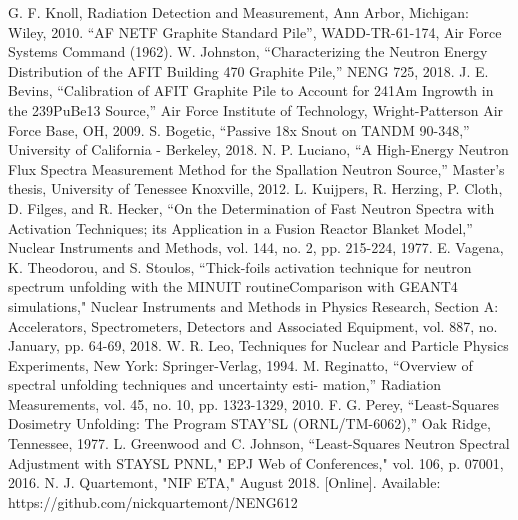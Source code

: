 \documentclass[journal]{IEEEtran}
\begin{document}
	\begin{thebibliography}{CLYC}
		G. F. Knoll, Radiation Detection and Measurement, Ann Arbor,
		Michigan: Wiley, 2010.
		“AF NETF Graphite Standard Pile”, WADD-TR-61-174, Air Force Systems Command (1962).
		W. Johnston, “Characterizing the Neutron Energy Distribution of the AFIT Building 470 Graphite Pile,” NENG 725, 2018.
		J. E. Bevins, “Calibration of AFIT Graphite Pile to Account for 241Am Ingrowth in the 239PuBe13 Source,” Air Force Institute of Technology, Wright-Patterson Air Force Base, OH, 2009. 
		S. Bogetic, “Passive 18x Snout on TANDM 90-348,” University of California - Berkeley, 2018.  
		N. P. Luciano, “A High-Energy Neutron Flux Spectra Measurement Method for
		the Spallation Neutron Source,” Master's thesis, University of Tenessee Knoxville,
		2012.
		L. Kuijpers, R. Herzing, P. Cloth, D. Filges, and R. Hecker, “On the Determination of Fast Neutron Spectra with Activation 
		Techniques; its Application in a Fusion Reactor Blanket Model,” Nuclear Instruments and Methods, vol. 144, no. 2, pp. 215-224, 1977. 
		E. Vagena, K. Theodorou, and S. Stoulos, “Thick-foils activation technique
		for neutron spectrum unfolding with the MINUIT routineComparison
		with GEANT4 simulations," Nuclear Instruments and Methods in Physics
		Research, Section A: Accelerators, Spectrometers, Detectors and Associated
		Equipment, vol. 887, no. January, pp. 64-69, 2018.
		W. R. Leo, Techniques for Nuclear and Particle Physics Experiments, New York: Springer-Verlag, 1994. 
		M. Reginatto, “Overview of spectral unfolding techniques and uncertainty esti-
		mation,” Radiation Measurements, vol. 45, no. 10, pp. 1323-1329, 2010.
		F. G. Perey, “Least-Squares Dosimetry Unfolding: The Program STAY'SL
		(ORNL/TM-6062),” Oak Ridge, Tennessee, 1977.
		L. Greenwood and C. Johnson, “Least-Squares Neutron Spectral Adjustment with
		STAYSL PNNL," EPJ Web of Conferences," vol. 106, p. 07001, 2016.
		N. J. Quartemont, "NIF ETA," August 2018. [Online]. Available:
		https://github.com/nickquartemont/NENG612
	\end{thebibliography}
	
\end{document}
